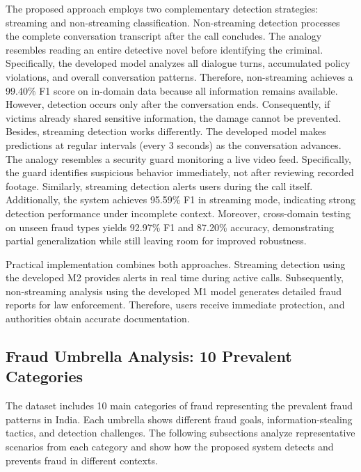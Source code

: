 \documentclass{article}
\begin{document}
The proposed approach employs two complementary detection strategies: streaming and non-streaming classification. Non-streaming detection processes the complete conversation transcript after the call concludes. The analogy resembles reading an entire detective novel before identifying the criminal. Specifically, the developed model analyzes all dialogue turns, accumulated policy violations, and overall conversation patterns. Therefore, non-streaming achieves a 99.40\% F1 score on in-domain data because all information remains available. However, detection occurs only after the conversation ends. Consequently, if victims already shared sensitive information, the damage cannot be prevented. Besides, streaming detection works differently. The developed model makes predictions at regular intervals (every 3 seconds) as the conversation advances. The analogy resembles a security guard monitoring a live video feed. Specifically, the guard identifies suspicious behavior immediately, not after reviewing recorded footage. Similarly, streaming detection alerts users during the call itself. Additionally, the system achieves 95.59\% F1 in streaming mode, indicating strong detection performance under incomplete context. Moreover, cross-domain testing on unseen fraud types yields 92.97\% F1 and 87.20\% accuracy, demonstrating partial generalization while still leaving room for improved robustness.

Practical implementation combines both approaches. Streaming detection using the developed M2 provides alerts in real time during active calls. Subsequently, non-streaming analysis using the developed M1 model generates detailed fraud reports for law enforcement. Therefore, users receive immediate protection, and authorities obtain accurate documentation.

\subsection{Fraud Umbrella Analysis: 10 Prevalent Categories}
\label{app:casestudy:umbrellas}

The dataset includes 10 main categories of fraud representing the prevalent fraud patterns in India. Each umbrella shows different fraud goals, information-stealing tactics, and detection challenges. The following subsections analyze representative scenarios from each category and show how the proposed system detects and prevents fraud in different contexts.
\end{document}
